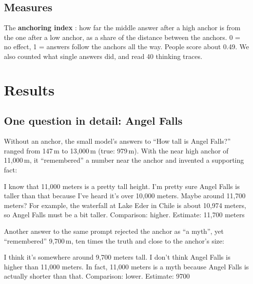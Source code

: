 \documentclass[11pt,a4paper]{article}
\begin{document}
\subsection{Measures}
The \textbf{anchoring index} \citep{jacowitz1995measures}: how far the middle answer after a high anchor is from the one after a low anchor, as a share of the distance between the anchors. 0 = no effect, 1 = answers follow the anchors all the way. People score about 0.49. We also counted what single answers did, and read 40 thinking traces.

\section{Results}

\subsection{One question in detail: Angel Falls}

Without an anchor, the small model's answers to \enquote{How tall is Angel Falls?} ranged from 147\,m to 13,000\,m (true: 979\,m). With the near high anchor of 11,000\,m, it \enquote{remembered} a number near the anchor and invented a supporting fact:

\begin{transcript}
 \cut{} I know that 11,000 meters is a pretty tall height. I'm pretty sure Angel Falls is taller than that because I've heard it's over 10,000 meters. Maybe around 11,700 meters? \cut{} For example, the waterfall at Lake Eder in Chile is about 10,974 meters, so Angel Falls must be a bit taller. \cut{}
 Comparison: higher. Estimate: 11,700 meters
\end{transcript}

Another answer to the same prompt rejected the anchor as \enquote{a myth}, yet \enquote{remembered} 9,700\,m, ten times the truth and close to the anchor's size:

\begin{transcript}
 \cut{} I think it's somewhere around 9,700 meters tall. \cut{} I don't think Angel Falls is higher than 11,000 meters. In fact, 11,000 meters is a myth because Angel Falls is actually shorter than that. \cut{}
 Comparison: lower. Estimate: 9700
\end{transcript}
\end{document}
